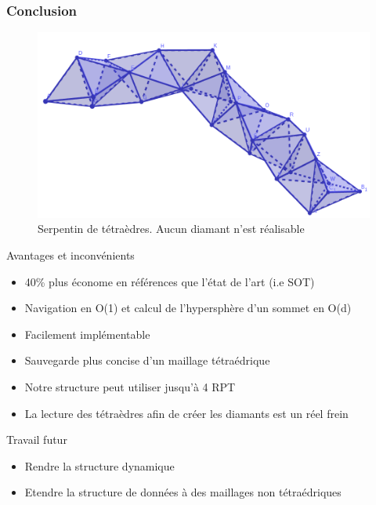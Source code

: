 \documentclass[9pt]{beamer}
\begin{document}
\begin{frame}
\small
\frametitle{Conclusion}
\begin{figure}[H]
\centering
\includegraphics[scale=0.1]{Images/serpentin}
\caption{Serpentin de tétraèdres. Aucun diamant n'est réalisable}
\end{figure}
\begin{block}{Avantages et inconvénients}
\begin{itemize}
\color{blue}
\item 40\% plus économe en références que l'état de l'art (i.e SOT)
\item Navigation en O(1) et calcul de l'hypersphère d'un sommet en O(d)
\item Facilement implémentable
\item Sauvegarde plus concise d'un maillage tétraédrique
\color{red}
\item Notre structure peut utiliser jusqu'à 4 RPT
\item La lecture des tétraèdres afin de créer les diamants est un réel frein
\end{itemize}
\color{blue}
\end{block}
\begin{block}{Travail futur}
\begin{itemize}
\item Rendre la structure dynamique
\item Etendre la structure de données à des maillages non tétraédriques
\end{itemize}
\end{block}
\end{frame}
\end{document}
